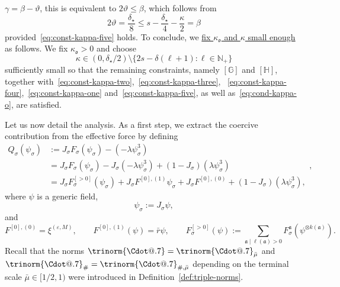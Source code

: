 \documentclass{article}
\makeatletter
\numberwithin{equation}{section}
\newcommand{\assign}{:=}
\newcommand*\Cdot{{\mathpalette\Cdot@{.7}}}
\newcommand*\Cdot@[2]{\mathbin{\vcenter{\hbox{\scalebox{#2}{\hspace{0.1mm}$\m@th#1\bullet$\hspace{0.1mm}}}}}}
\theoremstyle{plain}
\theoremstyle{definition}
\makeatother
\begin{document}
$\gamma=\beta-\vartheta$, this is equivalent to
$2\vartheta\leqslant\beta$, which follows from
\[
2\vartheta
=
\frac{\delta_\star}{8}
\leqslant
s-\frac{\delta_\star}{4}-\frac{\kappa}{2}
=
\beta
\]
provided~\eqref{eq:const-kappa-five} holds.
To conclude, we {\underline{fix $\kappa_{\mathfrak{o}}$ and $\kappa$ small
enough}} as follows. We fix $\kappa_{\mathfrak{o}} > 0$ and choose
\[
  \kappa \in (0, \delta_{\star} / 2)
  \setminus
  \{ 2 s - \delta (\ell + 1) : \ell \in \mathbb{N}_+ \}
\]
sufficiently small so that the remaining constraints, namely
$[\mathbb{G}]$ and $[\mathbb{H}]$, together
with~\eqref{eq:const-kappa-two},~\eqref{eq:const-kappa-three},
~\eqref{eq:const-kappa-four},~\eqref{eq:const-kappa-one}
and~\eqref{eq:const-kappa-five}, as well as~\eqref{eq:cond-kappa-o}, are
satisfied.

Let us now detail the analysis. As a first step, we extract the coercive
contribution from the effective force by defining
\begin{equation}
  \begin{aligned}
    Q_{\sigma} (\psi_\sigma) & \assign J_{\sigma} F_{\sigma}
    (\psi_{\sigma}) - (- \lambda \psi^3_{\sigma})\\
    & = J_{\sigma} F_{\sigma} (\psi_{\sigma}) - J_{\sigma} (- \lambda
    \psi^3_{\sigma}) + (1 - J_{\sigma}) (\lambda \psi^3_{\sigma})\\
    & = J_{\sigma} F_{\sigma}^{[> 0]} (\psi_{\sigma}) + J_{\sigma} F^{[0],
    (1)} \psi_{\sigma} + J_{\sigma} F^{[0], (0)} + (1 - J_{\sigma}) (\lambda
    \psi^3_{\sigma}),
  \end{aligned} , \label{eq:difference-decomposition}
\end{equation}
where $\psi$ is a generic field,
\[ \psi_{\sigma} \assign J_{\sigma} \psi, \]
and
\[ F^{[0], (0)} = \xi^{(\varepsilon, M)}, \qquad F ^{[0], (1)} (\psi) = \bar{r}
   \psi, \qquad F_{\sigma}^{[> 0]} (\psi ) \assign \sum_{\mathfrak{a}
   \mid \ell (\mathfrak{a}) > 0} F_{\sigma}^{\mathfrak{a}}
   (\psi^{\otimes k (\mathfrak{a})}) . \]
Recall that the norms $\trinorm{ \Cdot } =
\trinorm{ \Cdot }_{\bar{\mu}}$ and $\trinorm{ \Cdot
}_{\#} = \trinorm{ \Cdot }_{\#, \bar{\mu}}$ depending
on the terminal scale $\bar{\mu} \in [1 / 2, 1)$ were introduced in
Definition~\ref{def:triple-norms}.
\end{document}

